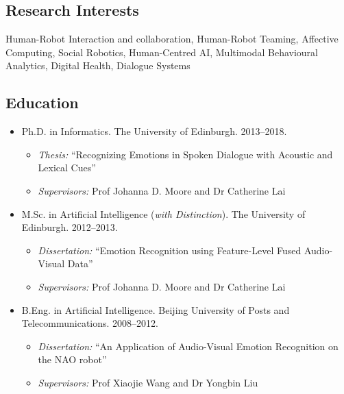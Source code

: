 \documentclass[11pt,letterpaper]{article}
\begin{document}
\smallskip

\subsection*{Research Interests}
Human-Robot Interaction and collaboration, Human-Robot Teaming, Affective Computing, Social Robotics, Human-Centred AI, Multimodal Behavioural Analytics, Digital Health, Dialogue Systems

\subsection*{Education}
\begin{itemize}
  \item Ph.D. in Informatics. The University of Edinburgh. 2013--2018.
  \begin{itemize}
    \item \emph{Thesis:} ``Recognizing Emotions in Spoken Dialogue with Acoustic and Lexical Cues''
    \item \emph{Supervisors:} Prof Johanna D. Moore and Dr Catherine Lai
  \end{itemize}
  \item M.Sc. in Artificial Intelligence (\emph{with Distinction}). The University of Edinburgh. 2012--2013.
  \begin{itemize}
    \item \emph{Dissertation:} ``Emotion Recognition using Feature-Level Fused Audio-Visual Data''
    \item \emph{Supervisors:} Prof Johanna D. Moore and Dr Catherine Lai
  \end{itemize}
  \item B.Eng. in Artificial Intelligence. Beijing University of Posts and Telecommunications. 2008--2012.
  \begin{itemize}
    \item \emph{Dissertation:} ``An Application of Audio-Visual Emotion Recognition on the NAO robot''
    \item \emph{Supervisors:} Prof Xiaojie Wang and Dr Yongbin Liu
  \end{itemize}
\end{itemize}
\end{document}
